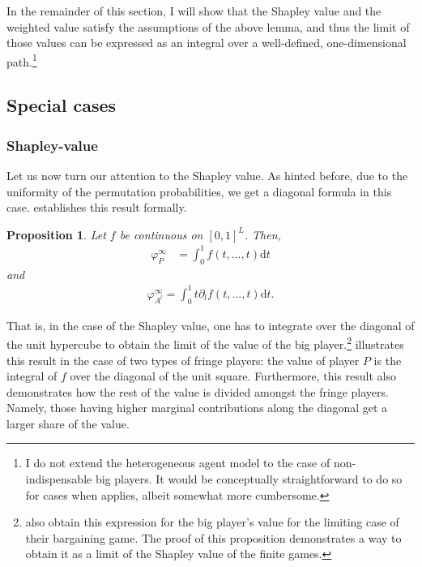 \documentclass[a4paper]{article}
\newtheorem{proposition}{Proposition}
\newcommand{\dt}{\mathrm{d}t}
\begin{document}
In the remainder of this section, I will show that the Shapley value and the weighted value satisfy the assumptions of the above lemma, and thus the limit of those values can be expressed as an integral over a well-defined, one-dimensional path.\footnote{
    I do not extend the heterogeneous agent model to the case of non-indispensable big players.
    It would be conceptually straightforward to do so for cases when  applies, albeit somewhat more cumbersome.
}

\subsection{Special cases}
\subsubsection{Shapley-value}

Let us now turn our attention to the Shapley value.
As hinted before, due to the uniformity of the permutation probabilities, we get a diagonal formula in this case.
 establishes this result formally.

\begin{proposition}
    \label{prop:many_sided_shapley}
    Let $f$ be continuous on $[0, 1]^L$.
    Then,
    \begin{align*}
        \varphi_P^\infty & = \int_0^1 f(t, \dots, t) \dt
    \end{align*}
    and
    \begin{align*}
        \varphi_{A^l}^\infty = \int_0^1 t \partial_l f(t, \dots, t) \dt.
    \end{align*}
\end{proposition}
That is, in the case of the Shapley value, one has to integrate over the diagonal of the unit hypercube to obtain the limit of the value of the big player.\footnote{
    \textcite{stole1996intra} also obtain this expression for the big player's value for the limiting case of their bargaining game.
    The proof of this proposition demonstrates a way to obtain it as a limit of the Shapley value of the finite games.
}
 illustrates this result in the case of two types of fringe players: the value of player $P$ is the integral of $f$ over the diagonal of the unit square.
Furthermore, this result also demonstrates how the rest of the value is divided amongst the fringe players.
Namely, those having higher marginal contributions along the diagonal get a larger share of the value.
\end{document}
